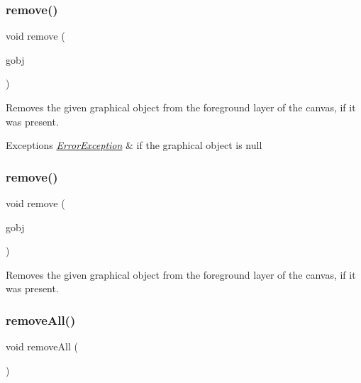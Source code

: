 \subsubsection{\texorpdfstring{remove()}{remove()}\hspace{0.1cm}{\footnotesize\ttfamily [1/2]}}
{\footnotesize\ttfamily void remove (\begin{DoxyParamCaption}\item[{\mbox{\hyperlink{classGObject}{G\+Object}} $\ast$}]{gobj }\end{DoxyParamCaption})\hspace{0.3cm}{\ttfamily [virtual]}}



Removes the given graphical object from the foreground layer of the canvas, if it was present. 


\begin{DoxyExceptions}{Exceptions}
{\em \mbox{\hyperlink{classErrorException}{Error\+Exception}}} & if the graphical object is null \\
\hline
\end{DoxyExceptions}
\mbox{\label{classGCanvas_a0c0ae4d69b584602ff3cba0d9cf330a4}} 
\subsubsection{\texorpdfstring{remove()}{remove()}\hspace{0.1cm}{\footnotesize\ttfamily [2/2]}}
{\footnotesize\ttfamily void remove (\begin{DoxyParamCaption}\item[{\mbox{\hyperlink{classGObject}{G\+Object}} \&}]{gobj }\end{DoxyParamCaption})\hspace{0.3cm}{\ttfamily [virtual]}}



Removes the given graphical object from the foreground layer of the canvas, if it was present. 

\mbox{\label{classGCanvas_a9b0a5a3ad9972ab0e8eb0b54873aac6b}} 
\subsubsection{\texorpdfstring{remove\+All()}{removeAll()}}
{\footnotesize\ttfamily void remove\+All (\begin{DoxyParamCaption}{ }\end{DoxyParamCaption})\hspace{0.3cm}{\ttfamily [virtual]}}



